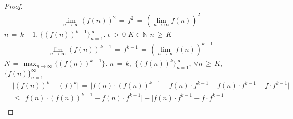 \begin{theorem}
\begin{proof}
\begin{align*}
        \lim_{n \longrightarrow \infty} (f(n))^{2} \hspace{2pt} = \hspace{2pt} f^{2} \hspace{2pt} = \hspace{2pt} (\lim_{n \longrightarrow \infty} f(n))^{2}
    \end{align*}
     $n \hspace{2pt} = \hspace{2pt} k - 1.$  $\{(f(n))^{k - 1}\}_{n = 1}^{\infty}.$  $\epsilon \hspace{2pt} > \hspace{2pt} 0$  $K \in \mathbb{N}$  $n \hspace{2pt} \geq \hspace{2pt} K$
    \begin{align*}
        \lim_{n \longrightarrow \infty} (f(n))^{k - 1} \hspace{2pt} = \hspace{2pt} f^{k - 1} \hspace{2pt} = \hspace{2pt} (\lim_{n \longrightarrow \infty} f(n))^{k - 1}
    \end{align*}
     $N \hspace{2pt} = \hspace{2pt} \max_{n \longrightarrow \infty}\{(f(n))^{k - 1}\}.$  $n \hspace{2pt} = \hspace{2pt} k,$  $\{(f(n))^{k}\}_{n = 1}^{\infty}, \hspace{2pt} \forall n \hspace{2pt} \geq \hspace{2pt} K,$  $\{f(n)\}_{n = 1}^{\infty}$
    \begin{align*}
        &\lvert (f(n))^{k} - (f)^{k} \rvert \hspace{2pt} = \hspace{2pt} \lvert f(n) \cdot (f(n))^{k - 1} - f(n) \cdot f^{k - 1} + f(n) \cdot f^{k - 1} - f \cdot f^{k - 1} \rvert \\[1ex]
        &\leq \hspace{2pt} \lvert f(n) \cdot (f(n))^{k - 1} - f(n) \cdot f^{k - 1} \rvert + \lvert f(n) \cdot f^{k - 1} - f \cdot f^{k - 1} \rvert \\[1ex]

\end{align*}
\end{proof}
\end{theorem}
